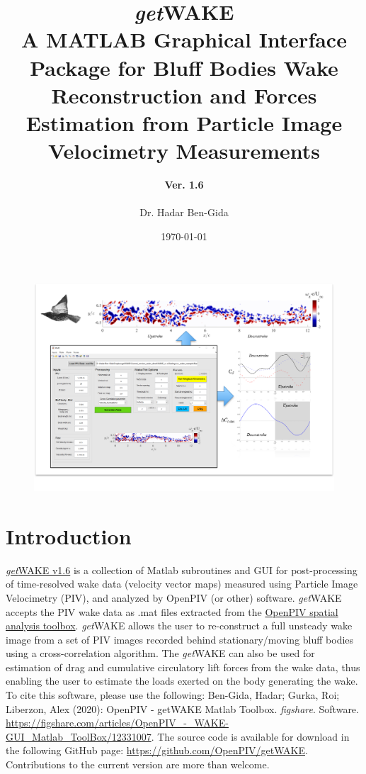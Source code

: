 \documentclass[12pt,a4paper]{article}
\title{\textbf{{\Huge \textit{get}WAKE} \\ A MATLAB Graphical Interface Package for Bluff Bodies Wake Reconstruction and Forces Estimation from Particle Image Velocimetry Measurements \newline {} \newline {\Huge User's Manual}}}
\author{
	\textbf{Ver. 1.6}\\
	\\
	Dr. Hadar Ben-Gida
}
\date{\today}
\begin{document}
\ifpdf
\graphicspath{{./Images/}}
\fi

\maketitle
\thispagestyle{empty}

\vspace{2mm} %

\begin{figure}[ht!]
	\centering
	\includegraphics[width=\textwidth]{getWAKE-Overview}
	\label{fig:getWAKE-Overview}
\end{figure}	

\newpage

\tableofcontents

\newpage


\section{Introduction}\label{Intro}

\href{https://github.com/OpenPIV/getWAKE}{\textit{get}WAKE v1.6} is a collection of Matlab subroutines and GUI for post-processing of time-resolved wake data (velocity vector maps) measured using Particle Image Velocimetry (PIV), and analyzed by OpenPIV (or other) software. 
\textit{get}WAKE accepts the PIV wake data as .mat files extracted from the \href{https://github.com/OpenPIV/openpiv-spatial-analysis-toolbox}{OpenPIV spatial analysis toolbox}.
\textit{get}WAKE allows the user to re-construct a full unsteady wake image from a set of PIV images recorded behind stationary/moving bluff bodies using a cross-correlation algorithm.
The \textit{get}WAKE can also be used for estimation of drag and cumulative circulatory lift forces from the wake data, thus enabling the user to estimate the loads exerted on the body generating the wake. 
To cite this software, please use the following:
Ben-Gida, Hadar; Gurka, Roi; Liberzon, Alex (2020): OpenPIV - getWAKE Matlab Toolbox. \textit{figshare}. Software. \url{https://figshare.com/articles/OpenPIV_-_WAKE-GUI_Matlab_ToolBox/12331007}. The source code is available for download in the following GitHub page: \url{https://github.com/OpenPIV/getWAKE}. Contributions to the current version are more than welcome.
\end{document}
